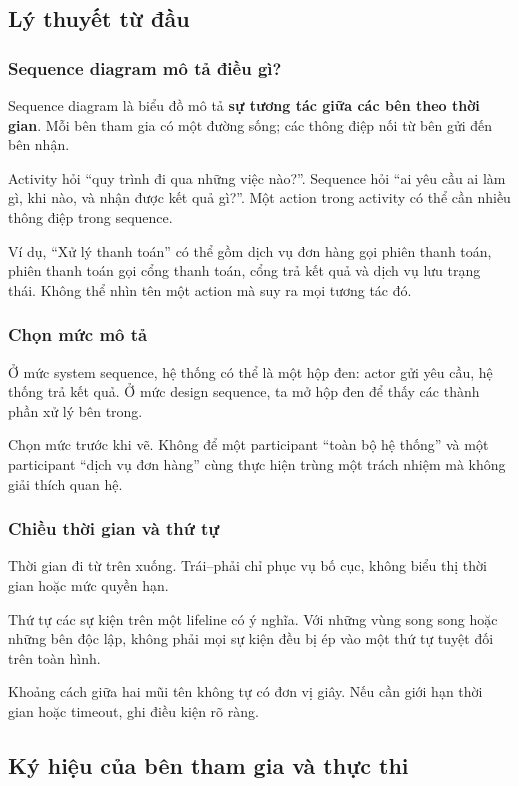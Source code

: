 \documentclass[12pt,a4paper]{article}
\begin{document}
\subsection{Lý thuyết từ đầu}
\subsubsection{Sequence diagram mô tả điều gì?}
Sequence diagram là biểu đồ mô tả \textbf{sự tương tác giữa các bên theo thời gian}. Mỗi bên tham gia có một đường sống; các thông điệp nối từ bên gửi đến bên nhận.

Activity hỏi “quy trình đi qua những việc nào?”. Sequence hỏi “ai yêu cầu ai làm gì, khi nào, và nhận được kết quả gì?”. Một action trong activity có thể cần nhiều thông điệp trong sequence.

Ví dụ, “Xử lý thanh toán” có thể gồm dịch vụ đơn hàng gọi phiên thanh toán, phiên thanh toán gọi cổng thanh toán, cổng trả kết quả và dịch vụ lưu trạng thái. Không thể nhìn tên một action mà suy ra mọi tương tác đó.

\subsubsection{Chọn mức mô tả}
Ở mức system sequence, hệ thống có thể là một hộp đen: actor gửi yêu cầu, hệ thống trả kết quả. Ở mức design sequence, ta mở hộp đen để thấy các thành phần xử lý bên trong.

Chọn mức trước khi vẽ. Không để một participant “toàn bộ hệ thống” và một participant “dịch vụ đơn hàng” cùng thực hiện trùng một trách nhiệm mà không giải thích quan hệ.

\subsubsection{Chiều thời gian và thứ tự}
Thời gian đi từ trên xuống. Trái--phải chỉ phục vụ bố cục, không biểu thị thời gian hoặc mức quyền hạn.

Thứ tự các sự kiện trên một lifeline có ý nghĩa. Với những vùng song song hoặc những bên độc lập, không phải mọi sự kiện đều bị ép vào một thứ tự tuyệt đối trên toàn hình.

Khoảng cách giữa hai mũi tên không tự có đơn vị giây. Nếu cần giới hạn thời gian hoặc timeout, ghi điều kiện rõ ràng.

\subsection{Ký hiệu của bên tham gia và thực thi}
\end{document}
